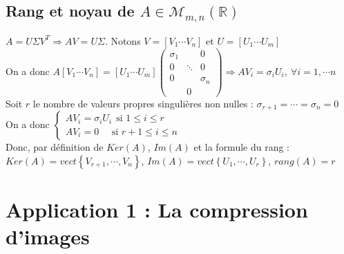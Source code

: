 \documentclass[a4paper,10pt]{report}
\begin{document}
\subsection{Rang et noyau de $A \in \mathcal{M}_{m,n}(\mathbb{R})$}
\noindent $A=U\Sigma V^T \Rightarrow AV=U\Sigma$. Notons $V=[V_1 \cdots V_n]$ et $U=[U_1 \cdots U_m]$\\
On a donc $A[V_1 \cdots V_n]=[U_1 \cdots U_m]\left( \begin{array}{ccc} \sigma_1 & & 0 \\ 0 & \ddots & 0 \\ 0 & & \sigma_n \\ & 0 & \end{array} \right) \Rightarrow AV_i=\sigma_iU_i, \ \forall i=1,\cdots n$\\
Soit $r$ le nombre de valeurs propres singulières non nulles : $\sigma_{r+1}=\cdots=\sigma_n=0$\\
On a donc $\left\lbrace
\begin{array}{l}
AV_i=\sigma_iU_i \ \ \text{si } 1\leq i \leq r\\
AV_i=0 \ \ \ \ \ \ \text{si } r+1\leq i \leq n
\end{array}\right.$\\
Donc, par définition de $Ker(A)$, $Im(A)$ et la formule du rang :\\
$Ker(A)=vect\left\lbrace V_{r+1},\cdots,V_n \right\rbrace$, $Im(A)=vect\left\lbrace U_1,\cdots,U_r\right\rbrace$, $rang(A)=r$

\newpage
\section{Application 1 : La compression d'images}
\end{document}
